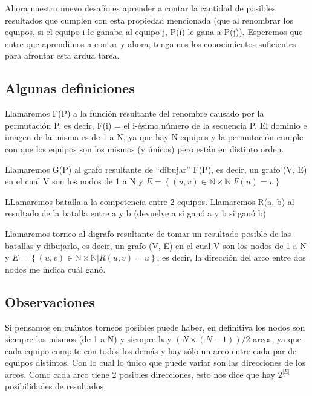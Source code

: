 	Ahora nuestro nuevo desafío es aprender a contar la cantidad de posibles resultados que cumplen con esta propiedad mencionada (que al renombrar los equipos, si el equipo i le ganaba al equipo j, P(i) le gana a P(j)). Esperemos que entre que aprendimos a contar y ahora, tengamos los conocimientos suficientes para afrontar esta ardua tarea. \newline


\subsection{Algunas definiciones}

	Llamaremos F(P) a la función resultante del renombre causado por la permutación P, es decir, F(i) = el i-ésimo número de la secuencia P. El dominio e imagen de la misma es de 1 a N, ya que hay N equipos y la permutación cumple con que los equipos son los mismos (y únicos) pero están en distinto orden. \newline

	Llamaremos G(P) al grafo resultante de ``dibujar'' F(P), es decir, un grafo (V, E) en el cual V son los nodos de 1 a N y $E=\left\{ (u, v)\in\mathbb{N \times N}| F(u) = v \right\}$  \newline

	LLamaremos batalla a la competencia entre 2 equipos. Llamaremos R(a, b) al resultado de la batalla entre a y b (devuelve a si ganó a y b si ganó b) \newline

	Llamaremos torneo al digrafo resultante de tomar un resultado posible de las batallas y dibujarlo, es decir, un grafo (V, E) en el cual V son los nodos de 1 a N y $E=\left\{ (u, v)\in\mathbb{N \times N}| R(u, v) = u \right\}$, es decir, la dirección del arco entre dos nodos me indica cuál ganó.

\subsection{Observaciones}

	Si pensamos en cuántos torneos posibles puede haber, en definitiva los nodos son siempre los mismos (de 1 a N) y siempre hay $(N \times (N - 1)) / 2$ arcos, ya que cada equipo compite con todos los demás y hay sólo un arco entre cada par de equipos distintos. Con lo cual lo único que puede variar son las direcciones de los arcos. Como cada arco tiene 2 posibles direcciones, esto nos dice que hay $2^|E|$ posibilidades de resultados.  \newline

